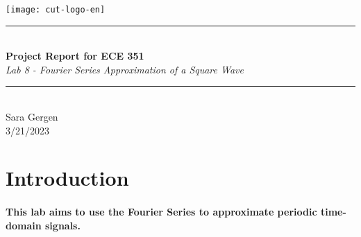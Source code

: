 \documentclass[12pt,a4paper]{article}
\newcommand{\HRule}{\rule{\linewidth}{0.5mm}}
\begin{document}
\begin{titlepage}
\begin{center}

\texttt{[image: cut-logo-en]}~\\[2cm]


\HRule \\[0.4cm]
{ \LARGE 
  \textbf{Project Report for ECE 351}\\[0.4cm]
  \emph{Lab 8 - Fourier Series Approximation of a Square Wave}\\[0.4cm]
}
\HRule \\[1. 5cm]



{ \large
  Sara Gergen \\[0.1cm]
  3/21/2023\\[0.1cm]
}

\vfill



\end{center}
\end{titlepage}


\newpage



\tableofcontents
{}
\newpage
\setcounter{page}{1}

\section{Introduction}\label{sec:intro}

\paragraph{This lab aims to use the Fourier Series to approximate periodic time-domain signals.}
\end{document}
